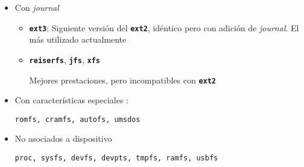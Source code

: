 \documentclass[ucs]{beamer}
\begin{document}
\begin{frame}[fragile]
  \begin{itemize}
  \item Con \emph{journal}
    \begin{itemize}
    \item \texttt{\textbf{ext3}}: Siguiente versión del
      \texttt{\textbf{ext2}}, idéntico pero con adición de
      \emph{journal}. El más utilizado actualmente
    \item \texttt{\textbf{reiserfs}}, \texttt{\textbf{jfs}}, \texttt{\textbf{xfs}}

    Mejores prestaciones, pero incompatibles con   
    \texttt{\textbf{ext2}}
    \end{itemize}
  \item Con características especiales :

 \verb|romfs, cramfs, autofs, umsdos|
  \item No asociados a dispositivo

 \verb|proc, sysfs, devfs, devpts, tmpfs, ramfs, usbfs|
  \end{itemize}
\end{frame}
\end{document}
